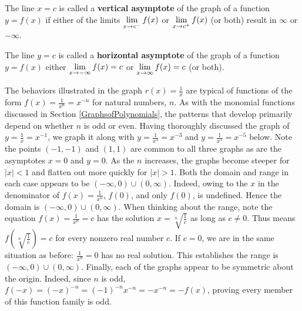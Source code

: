 \documentclass{ximera}
\begin{document}
\colorbox{ResultColor}{\bbm

\begin{defn} \label{va} The line $x=c$ is called a \textbf{vertical asymptote} of the graph of a function $y=f(x)$  if either of the limits $\ds{ \lim_{x \rightarrow c^{-}} f(x)}$ or  $\ds{ \lim_{x \rightarrow c^{+}} f(x)}$ (or both) result in $\infty$ or $-\infty$.

\end{defn}
\ebm}

\medskip


\colorbox{ResultColor}{\bbm

\begin{defn} \label{ha} The line $y=c$ is called a \textbf{horizontal asymptote} of the graph of a function $y=f(x)$ either  $\ds{ \lim_{x \rightarrow -\infty} f(x)=c}$ or  $\ds{ \lim_{x \rightarrow \infty} f(x)=c}$ (or both).
\end{defn}
\ebm}

\medskip


The behaviors illustrated in the graph $r(x) = \frac{1}{x}$ are typical of functions of the form $f(x) = \frac{1}{x^n} = x^{-n}$ for natural numbers, $n$.  As with the monomial functions discussed in Section \ref{GraphsofPolynomials}, the patterns that develop primarily depend on whether $n$ is odd or even.  Having thoroughly discussed the graph of $y = \frac{1}{x} = x^{-1}$, we graph it along with $y = \frac{1}{x^3} = x^{-3}$ and $y = \frac{1}{x^5} = x^{-5}$ below.  Note the points $(-1,-1)$ and $(1,1)$ are common to all three graphs as are the asymptotes $x = 0$ and $y = 0$.  As the $n$ increases, the graphs become steeper for $|x| < 1$  and flatten out more quickly for $|x|>1$.  Both the domain and range in each case appears to be $(-\infty, 0) \cup (0, \infty)$.  Indeed, owing to the $x$ in the denominator of $f(x) = \frac{1}{x^n}$, $f(0)$, and only $f(0)$,  is undefined. Hence the domain is $(-\infty, 0) \cup (0, \infty)$.  When thinking about the range, note the equation  $f(x)= \frac{1}{x^n}  = c$ has the solution $x = \sqrt[n]{\frac{1}{c}}$ as long as $c \neq 0$.  Thus means $f\left( \sqrt[n]{\frac{1}{c}} \right) = c$ for every nonzero real number $c$.  If $c = 0$, we are in the same situation as before:  $\frac{1}{x^n} = 0$ has no real solution.  This establishes the range is $(-\infty, 0) \cup (0, \infty)$.  Finally, each of the graphs appear to be symmetric about the origin.  Indeed, since $n$ is odd, $f(-x) = (-x)^{-n} = (-1)^{-n} x^{-n} = -x^{-n} = -f(x)$, proving every member of this function family is odd.  
\end{document}
